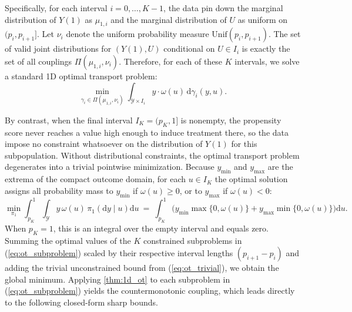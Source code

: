 Specifically, for each interval $i = 0, \dots, K-1$, the data pin down the marginal distribution of $Y(1)$ as $\mu_{1, i}$ and the marginal distribution of $U$ as uniform on $(p_i, p_{i+1}]$. Let $\nu_i$ denote the uniform probability measure $\text{Unif}(p_i, p_{i+1})$. The set of valid joint distributions for $(Y(1), U)$ conditional on $U \in I_i$ is exactly the set of all couplings $\Pi(\mu_{1, i}, \nu_i)$. Therefore, for each of these $K$ intervals, we solve a standard 1D optimal transport problem:
\begin{equation} \label{eq:ot_subproblem}
    \min_{\gamma_i \in \Pi(\mu_{1, i}, \nu_i)} \int_{\mathcal{Y} \times I_i} y \cdot \omega(u) \, \mathrm{d}\gamma_i(y, u).
\end{equation}

By contrast, when the final interval $I_K = (p_K, 1]$ is nonempty, the propensity score never reaches a value high enough to induce treatment there, so the data impose no constraint whatsoever on the distribution of $Y(1)$ for this subpopulation. Without distributional constraints, the optimal transport problem degenerates into a trivial pointwise minimization. Because $y_{\min}$ and $y_{\max}$ are the extrema of the compact outcome domain, for each $u \in I_K$ the optimal solution assigns all probability mass to $y_{\min}$ if $\omega(u) \geqslant 0$, or to $y_{\max}$ if $\omega(u) < 0$:
\begin{equation} \label{eq:ot_trivial}
    \min_{\pi_{1}} \int_{p_K}^1 \int_{\mathcal{Y}} y \, \omega(u) \, \pi_{1}(\mathrm{d}y \mid u) \mathrm{d}u \ = \ \int_{p_K}^1 \Big( y_{\min} \max\{0, \omega(u)\} + y_{\max} \min\{0, \omega(u)\} \Big) \mathrm{d}u.
\end{equation}
When $p_K=1$, this is an integral over the empty interval and equals zero.
Summing the optimal values of the $K$ constrained subproblems in (\ref{eq:ot_subproblem}) scaled by their respective interval lengths $(p_{i+1} - p_i)$ and adding the trivial unconstrained bound from (\ref{eq:ot_trivial}), we obtain the global minimum. Applying \cref{thm:1d_ot} to each subproblem in (\ref{eq:ot_subproblem}) yields the countermonotonic coupling, which leads directly to the following closed-form sharp bounds.

